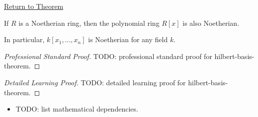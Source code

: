 \newpage
{}
\label{prf:hilbert-basis-theorem}

\begin{remark*}[Return]
\hyperref[thm:hilbert-basis-theorem]{Return to Theorem}
\end{remark*}

\begin{theorem*}
If $R$ is a Noetherian ring, then the polynomial ring $R[x]$
is also Noetherian.

In particular, $k[x_1, \dots, x_n]$ is Noetherian for any field $k$.
\end{theorem*}

\begin{proof}[Professional Standard Proof]
\LRAProofBodyStart
TODO: professional standard proof for hilbert-basis-theorem.
\end{proof}

\begin{proof}[Detailed Learning Proof]
\LRAProofBodyStart
TODO: detailed learning proof for hilbert-basis-theorem.
\end{proof}

\begin{remark*}
\end{remark*}

\begin{dependencies}
\begin{itemize}
  \item TODO: list mathematical dependencies.
\end{itemize}
\end{dependencies}

\clearpage

